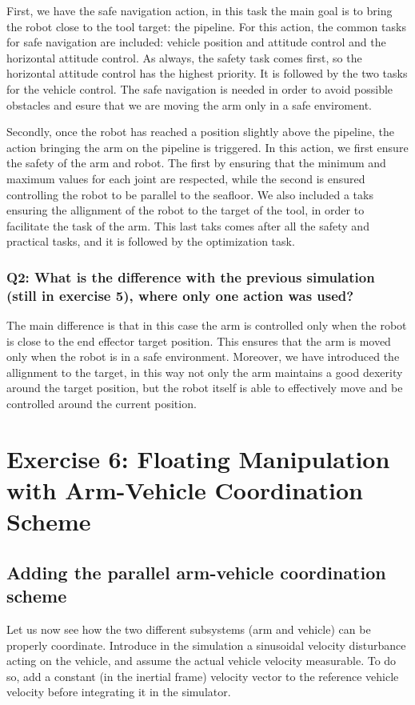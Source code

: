 \documentclass{article}
\begin{document}
First, we have the safe navigation action, in this task the main goal is to bring the robot close to the tool target: the pipeline. For this action, the common tasks for safe navigation are included: vehicle position and attitude control and the horizontal attitude control. As always, the safety task comes first, so the horizontal attitude control has the highest priority. It is followed by the two tasks for the vehicle control. The safe navigation is needed in order to avoid possible obstacles and esure that we are moving the arm only in a safe enviroment. 

Secondly, once the robot has reached a position slightly above the pipeline, the action bringing the arm on the pipeline is triggered. In this action, we first ensure the safety of the arm and robot. The first by ensuring that the minimum and maximum values for each joint are respected, while the second is ensured controlling the robot to be parallel to the seafloor. We also included a taks ensuring the allignment of the robot to the target of the tool, in order to facilitate the task of the arm. This last taks comes after all the safety and practical tasks, and it is followed by the optimization task. 

\subsubsection{Q2: What is the difference with the previous simulation (still in exercise 5), where only one action was used?}

The main difference is that in this case the arm is controlled only when the robot is close to the end effector target position. This ensures that the arm is moved only when the robot is in a safe environment. 
Moreover, we have introduced the allignment to the target, in this way not only the arm maintains a good dexerity around the target position, but the robot itself is able to effectively move and be controlled around the current position. 
\clearpage
\section{Exercise 6: Floating Manipulation with Arm-Vehicle Coordination Scheme}
\subsection{Adding the parallel arm-vehicle coordination scheme}
Let us now see how the two different subsystems (arm and vehicle) can be properly coordinate. Introduce in the simulation a sinusoidal velocity disturbance acting on the vehicle, and assume the actual vehicle velocity measurable. To do so, add a constant (in the inertial frame) velocity vector to the reference vehicle velocity before integrating it in the simulator.
\end{document}
